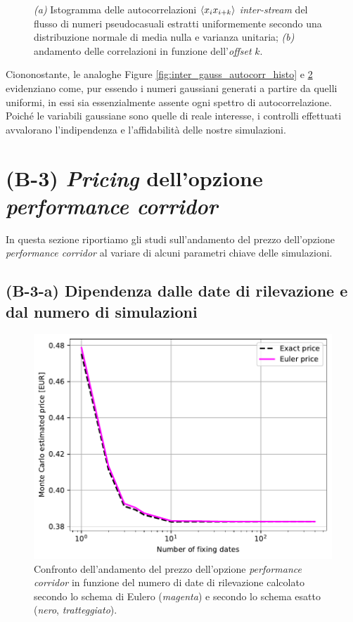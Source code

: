 \begin{figure}[t]
\begin{subfigure}{.5\textwidth}
  \caption{}
  \label{fig:inter_gauss_autocorr_offset}
\end{subfigure}
\caption{\textit{(a)} Istogramma delle autocorrelazioni $\braket{x_i x_{i+k}}$ \textit{inter-stream} del flusso di numeri pseudocasuali estratti uniformemente secondo una distribuzione normale di media nulla e varianza unitaria; \textit{(b)} andamento delle correlazioni in funzione dell'\textit{offset} $k$.}
\end{figure}

Ciononostante, le analoghe Figure \ref{fig:inter_gauss_autocorr_histo} e \ref{fig:inter_gauss_autocorr_offset} evidenziano come, pur essendo i numeri gaussiani generati a partire da quelli uniformi, in essi sia essenzialmente assente ogni spettro di autocorrelazione. Poiché le variabili gaussiane sono quelle di reale interesse, i controlli effettuati avvalorano l'indipendenza e l'affidabilità delle nostre simulazioni.

\section{(B-3) \textit{Pricing} dell'opzione \textit{performance corridor}}
In questa sezione riportiamo gli studi sull'andamento del prezzo dell'opzione \textit{performance corridor} al variare di alcuni parametri chiave delle simulazioni.

\subsection{(B-3-a) Dipendenza dalle date di rilevazione e dal numero di simulazioni}

\begin{figure}[t]
    \centering
    \includegraphics[scale=0.5]{graphs/OptionPriceVsM_PriceVsM_N100mln.pdf}
    \caption{Confronto dell'andamento del prezzo dell'opzione \textit{performance corridor} in funzione del numero di date di rilevazione calcolato secondo lo schema di Eulero (\textit{magenta}) e secondo lo schema esatto (\textit{nero}, \textit{tratteggiato}).}
    \label{fig:exactvseuler_M}
\end{figure}

